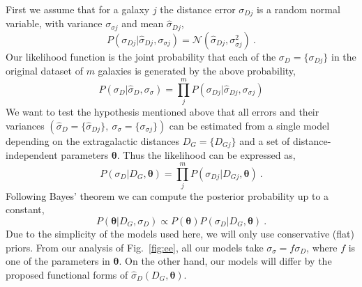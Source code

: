 \documentclass[a4paper,fleqn,usenatbib]{mnras}
\begin{document}
First we assume that for a galaxy $j$ the distance error $\sigma_{Dj}$ is a random normal variable, with variance $\sigma_{\sigma j}$ and mean $\hat{\sigma}_{Dj}$, 
\begin{equation}
P(\sigma_{Dj}|\hat{\sigma}_{Dj},\sigma_{\sigma j})=\mathcal{N}(\hat{\sigma}_{Dj},\sigma_{\sigma j}^2)\ .
	\label{eq:prob}
\end{equation}
Our likelihood function is the joint probability that each of the $\sigma_D=\{\sigma_{Dj}\}$ in the original dataset of $m$ galaxies is generated by the above probability,  
\begin{equation}
 P(\sigma_{D}|\hat{\sigma}_{D},\sigma_{\sigma})=\prod_j^mP(\sigma_{Dj}|\hat{\sigma}_{Dj},\sigma_{\sigma j})
\end{equation}
We want to test the hypothesis mentioned above that all errors and their variances $(\hat{\sigma}_D=\{\hat{\sigma}_{Dj}\},\ \sigma_\sigma=\{\sigma_{\sigma j}\})$ can be estimated from a single model depending on the extragalactic distances $D_G=\{D_{Gj}\}$ and a set of distance-independent parameters $\pmb{\theta}$. Thus the likelihood can be expressed as,
\[P(\sigma_D|D_G,\pmb{\theta})=\prod_j^mP(\sigma_{Dj}|D_{Gj},\pmb{\theta})\ .\]
Following Bayes' theorem we can compute the posterior probability up to a constant,
\[P(\pmb{\theta}|D_G,\sigma_D)\propto P(\pmb{\theta})P(\sigma_D|D_G,\pmb{\theta})\ .\]
Due to the simplicity of the models used here, we will only use conservative (flat) priors. From our analysis of Fig.~\ref{fig:ee}, all our models take $\sigma_\sigma=f\sigma_D$, where $f$ is one of the parameters in $\pmb{\theta}$. On the other hand, our models will differ by the proposed functional forms of $\hat{\sigma}_D(D_G,\pmb{\theta})$.\\
\end{document}
